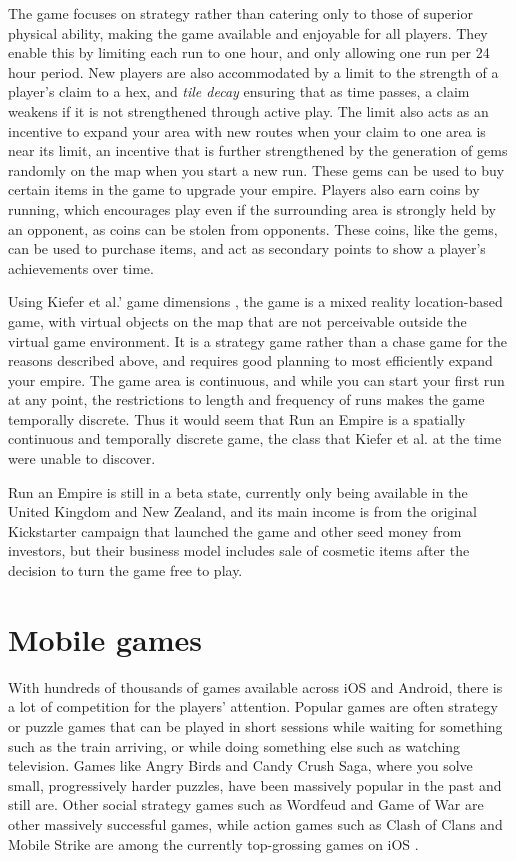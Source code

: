 The game focuses on strategy rather than catering only to those of superior physical ability, making the game available and enjoyable for all players. They enable this by limiting each run to one hour, and only allowing one run per 24 hour period. New players are also accommodated by a limit to the strength of a player's claim to a hex, and \emph{tile decay} ensuring that as time passes, a claim weakens if it is not strengthened through active play. The limit also acts as an incentive to expand your area with new routes when your claim to one area is near its limit, an incentive that is further strengthened by the generation of gems randomly on the map when you start a new run. These gems can be used to buy certain items in the game to upgrade your empire. Players also earn coins by running, which encourages play even if the surrounding area is strongly held by an opponent, as coins can be stolen from opponents. These coins, like the gems, can be used to purchase items, and act as secondary points to show a player's achievements over time.

Using Kiefer et al.' game dimensions \cite{kiefer2006systematically}, the game is a mixed reality location-based game, with virtual objects on the map that are not perceivable outside the virtual game environment. It is a strategy game rather than a chase game for the reasons described above, and requires good planning to most efficiently expand your empire. The game area is continuous, and while you can start your first run at any point, the restrictions to length and frequency of runs makes the game temporally discrete. Thus it would seem that Run an Empire is a spatially continuous and temporally discrete game, the class that Kiefer et al. at the time were unable to discover.

Run an Empire is still in a beta state, currently only being available in the United Kingdom and New Zealand, and its main income is from the original Kickstarter campaign that launched the game and other seed money from investors, but their business model includes sale of cosmetic items after the decision to turn the game free to play.

\section{Mobile games}

With hundreds of thousands of games available across iOS \cite{pocketgamerAppstore} and Android, there is a lot of competition for the players' attention. Popular games are often strategy or puzzle games that can be played in short sessions while waiting for something such as the train arriving, or while doing something else such as watching television. Games like Angry Birds and Candy Crush Saga, where you solve small, progressively harder puzzles, have been massively popular in the past and still are. Other social strategy games such as Wordfeud and Game of War are other massively successful games, while action games such as Clash of Clans and Mobile Strike are among the currently top-grossing games on iOS \cite{appAnnieIOS}.

